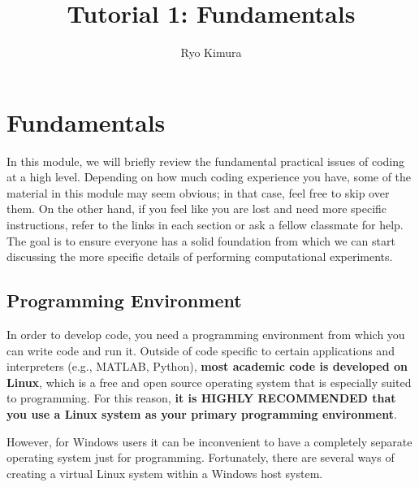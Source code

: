 \documentclass[12pt]{article}
\begin{document}
\title{Tutorial 1: Fundamentals}
\author{Ryo Kimura}
\maketitle

\section{Fundamentals}
In this module, we will briefly review the fundamental practical issues of coding at a high level. Depending on how much coding experience you have, some of the material in this module may seem obvious; in that case, feel free to skip over them. On the other hand, if you feel like you are lost and need more specific instructions, refer to the links in each section or ask a fellow classmate for help. The goal is to ensure everyone has a solid foundation from which we can start discussing the more specific details of performing computational experiments.

\subsection{Programming Environment} \label{sec:progenv}
In order to develop code, you need a programming environment from which you can write code and run it. Outside of code specific to certain applications and interpreters (e.g., MATLAB, Python), \textbf{most academic code is developed on Linux}, which is a free and open source operating system that is especially suited to programming. For this reason, \textbf{it is HIGHLY RECOMMENDED that you use a Linux system as your primary programming environment}.

However, for Windows users it can be inconvenient to have a completely separate operating system just for programming. Fortunately, there are several ways of creating a virtual Linux system within a Windows host system.
\end{document}
